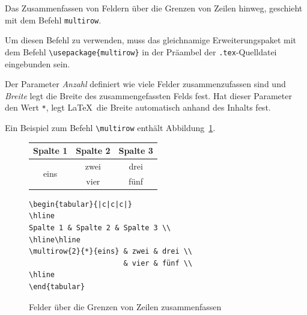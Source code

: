 \documentclass[a4paper,10pt,twoside]{scrbook}
\begin{document}
{Das Zusammenfassen von Feldern über die Grenzen von Zeilen hinweg, geschieht mit dem Befehl \verb!multirow!.


Um diesen Befehl zu verwenden, muss das gleichnamige Erweiterungspaket mit dem Befehl \verb!\usepackage{multirow}! in der Präambel der \verb!.tex!-Quelldatei eingebunden sein.

Der Parameter \textsl{Anzahl} definiert wie viele Felder zusammenzufassen sind und \textsl{Breite} legt die Breite des zusammengefassten Felds fest. Hat dieser Parameter den Wert \verb!*!, legt \LaTeX\ die Breite automatisch anhand des Inhalts fest.


Ein Beispiel zum Befehl \verb!\multirow! enthält Abbildung~\ref{Beispiel_multirow1}.


\begin{figure}[H]
\begin{minipage}[t]{0.44\textwidth}
\setlength{\parskip}{1em}

\centering
\label{Tabelle_Multirow1}
\begin{tabular}{|c|c|c|}
\hline
Spalte 1 & Spalte 2 & Spalte 3 \\
\hline\hline
\multirow{2}{*}{eins} & zwei & drei \\
                      & vier & fünf \\
\hline
\end{tabular}
\end{minipage}
\hfill
\begin{minipage}[t]{0.54\textwidth}
\setlength{\parskip}{1em}

\begin{lstlisting}[label=tabularmultirow1, style=customlatex]
\begin{tabular}{|c|c|c|}
\hline
Spalte 1 & Spalte 2 & Spalte 3 \\
\hline\hline
\multirow{2}{*}{eins} & zwei & drei \\
                      & vier & fünf \\
\hline
\end{tabular}
\end{lstlisting}
\end{minipage}
\caption{Felder über die Grenzen von Zeilen zusammenfassen}
\label{Beispiel_multirow1}
\end{figure}


}
\end{document}
